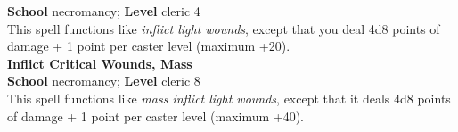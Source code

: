 \textbf{School} necromancy; \textbf{Level} cleric 4\\
This spell functions like \textit{inflict light wounds}, except that you deal 4d8 points of damage + 1 point per caster level (maximum +20).\\
\textbf{Inflict Critical Wounds, Mass}\\
\textbf{School} necromancy; \textbf{Level} cleric 8\\
This spell functions like \textit{mass inflict light wounds}, except that it deals 4d8 points of damage + 1 point per caster level (maximum +40).\\
